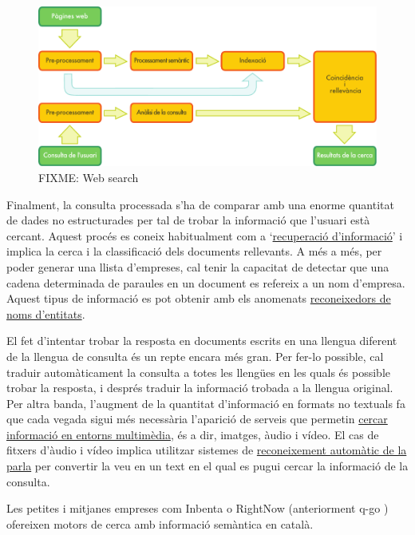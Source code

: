 \documentclass[]{../../metanetpaper}
\begin{document}
\begin{multicols}{2}
\begin{figure}[htb]
  \vspace{-9mm}
  \center
  \includegraphics[width=\textwidth]{../_media/catalan/web_search_architecture}
  \vspace{-5mm}
  \caption{FIXME: Web search}
  \label{fig:websearcharch_ca}
\end{figure}

Finalment, la consulta processada s’ha de comparar amb una enorme quantitat de dades no estructurades per tal de trobar la informació que l'usuari està cercant. Aquest procés es coneix habitualment com a ‘\underline{recuperació d'informació}’ i implica la cerca i la classificació dels documents rellevants. A més a més, per poder generar una llista d’empreses, cal tenir la capacitat de detectar que una cadena determinada de paraules en un document es refereix a un nom d'empresa. Aquest tipus de informació es pot obtenir amb els anomenats \underline{reconeixedors de noms d’entitats}.

El fet d’intentar trobar la resposta en documents escrits en una llengua diferent de la llengua de consulta és un repte encara més gran. Per fer-lo possible, cal traduir automàticament la consulta a totes les llengües en les quals és possible trobar la resposta, i després traduir la informació trobada a la llengua original. Per altra banda, l’augment de la quantitat d’informació en formats no textuals fa que cada vegada sigui més necessària l’aparició de serveis que permetin \underline{cercar informació en entorns multimèdia}, és a dir, imatges, àudio i vídeo. El cas de fitxers d’àudio i vídeo implica utilitzar sistemes de \underline{reconeixement automàtic de la parla} per convertir la veu en un text en el qual es pugui cercar la informació de la consulta. 

Les petites i mitjanes empreses com Inbenta \cite{CAT-inbenta} o RightNow  (anteriorment q-go \cite{CAT-rightnow}) ofereixen motors de cerca amb informació semàntica en català.


\end{multicols}
\end{document}
